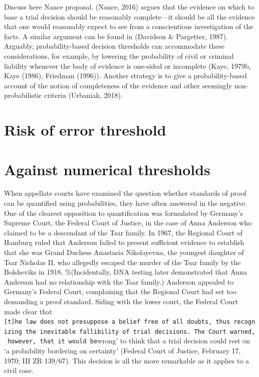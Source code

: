 \documentclass[10pt,dvipsnames]{scrartcl}
\begin{document}
Discuss here Nance proposal. (Nance, 2016) argues that the evidence on
which to base a trial decision should be reasonably complete---it should
be all the evidence that one would reasonably expect to see from a
conscientious investigation of the facts. A similar argument can be
found in (Davidson \& Pargetter, 1987). Arguably, probability-based
decision thresholds can accommodate these considerations, for example,
by lowering the probability of civil or criminal liability whenever the
body of evidence is one-sided or incomplete (Kaye, 1979b, Kaye (1986),
Friedman (1996)). Another strategy is to give a probability-based
account of the notion of completeness of the evidence and other
seemingly non-probabilistic criteria (Urbaniak, 2018).

\section{Risk of error threshold}\label{risk-of-error-threshold}

\section{Against numerical
thresholds}\label{against-numerical-thresholds}

When appellate courts have examined the question whether standards of
proof can be quantified using probabilities, they have often answered in
the negative. One of the clearest opposition to quantification was
formulated by Germany's Supreme Court, the Federal Court of Justice, in
the case of Anna Anderson who claimed to be a descendant of the Tsar
family. In 1967, the Regional Court of Hamburg ruled that Anderson
failed to present sufficient evidence to establish that she was Grand
Duchess Anastasia Nikolayevna, the youngest daughter of Tsar Nicholas
II, who allegedly escaped the murder of the Tsar family by the
Bolsheviks in 1918. \%(Incidentally, DNA testing later demonstrated that
Anna Anderson had no relationship with the Tsar family.) Anderson
appealed to Germany's Federal Court, complaining that the Regional Court
had set too demanding a proof standard. Siding with the lower court, the
Federal Court made clear that
\texttt{{[}t{]}he\ law\ does\ not\ presuppose\ a\ belief\ free\ of\ all\ doubts\textquotesingle{},\ thus\ recognizing\ the\ inevitable\ fallibility\ of\ trial\ decisions.\ The\ Court\ warned,\ however,\ that\ it\ would\ be}wrong'
to think that a trial decision could rest on `a probability bordering on
certainty' (Federal Court of Justice, February 17, 1970; III ZR 139/67).
This decision is all the more remarkable as it applies to a civil case.
\end{document}
